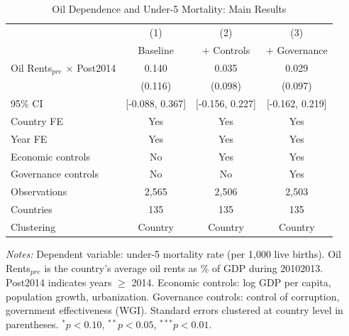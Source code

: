 \begin{table}[H]
\centering
\caption{Oil Dependence and Under-5 Mortality: Main Results}
\label{tab:main}
\begin{threeparttable}
\begin{tabular}{lccc}
\toprule
& (1) & (2) & (3) \\
& Baseline & + Controls & + Governance \\
\midrule
Oil Rents$_{pre}$ $\times$ Post2014 & 0.140 & 0.035 & 0.029 \\
& (0.116) & (0.098) & (0.097) \\
95\% CI & [-0.088, 0.367] & [-0.156, 0.227] & [-0.162, 0.219] \\
\midrule
Country FE & Yes & Yes & Yes \\
Year FE & Yes & Yes & Yes \\
Economic controls & No & Yes & Yes \\
Governance controls & No & No & Yes \\
Observations & 2,565 & 2,506 & 2,503 \\
Countries & 135 & 135 & 135 \\
Clustering & Country & Country & Country \\
\bottomrule
\end{tabular}
\begin{tablenotes}\small
\item \textit{Notes:} Dependent variable: under-5 mortality rate (per 1,000 live births). Oil Rents$_{pre}$ is the country's average oil rents as \% of GDP during 2010\textendash{}2013. Post2014 indicates years $\geq$ 2014. Economic controls: log GDP per capita, population growth, urbanization. Governance controls: control of corruption, government effectiveness (WGI). Standard errors clustered at country level in parentheses. $^{*}p<0.10$, $^{**}p<0.05$, $^{***}p<0.01$.
\end{tablenotes}
\end{threeparttable}
\end{table}
